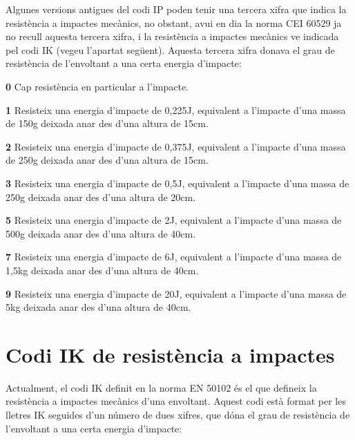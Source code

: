 Algunes versions antigues del codi \textsf{IP} poden tenir una tercera xifra que indica la resist\`{e}ncia a impactes mec\`{a}nics, no obstant, avui en dia la norma \textsf{CEI 60529} ja no recull aquesta tercera xifra, i la resist\`{e}ncia a impactes mec\`{a}nics ve indicada pel codi \textsf{IK} (vegeu l'apartat seg\"{u}ent). Aquesta tercera xifra donava el grau de resist\`{e}ncia de l'envoltant a una certa energia d'impacte:
\begin{list}{}
   {\setlength{\labelwidth}{10mm} \setlength{\leftmargin}{10mm} \setlength{\labelsep}{2mm}}
   \item[\textbf{0}] Cap resist\`{e}ncia en particular a l'impacte.
   \item[\textbf{1}] Resisteix una energia d'impacte de 0{,}225\unit{J}, equivalent a l'impacte d'una massa de 150\unit{g} deixada anar des d'una altura de 15\unit{cm}.
   \item[\textbf{2}] Resisteix una energia d'impacte de 0{,}375\unit{J}, equivalent a l'impacte d'una massa de 250\unit{g} deixada anar des d'una altura de 15\unit{cm}.
   \item[\textbf{3}] Resisteix una energia d'impacte de 0{,}5\unit{J}, equivalent a l'impacte d'una massa de 250\unit{g} deixada anar des d'una altura de 20\unit{cm}.
   \item[\textbf{5}] Resisteix una energia d'impacte de 2\unit{J}, equivalent a l'impacte d'una massa de 500\unit{g} deixada anar des d'una altura de 40\unit{cm}.
   \item[\textbf{7}] Resisteix una energia d'impacte de 6\unit{J}, equivalent a l'impacte d'una massa de 1{,}5\unit{kg} deixada anar des d'una altura de 40\unit{cm}.
   \item[\textbf{9}]Resisteix una energia d'impacte de 20\unit{J}, equivalent a l'impacte d'una massa de 5\unit{kg} deixada anar des d'una altura de 40\unit{cm}.
\end{list}

\section{Codi IK de resist\`{e}ncia a impactes}   

Actualment, el codi \textsf{IK} definit en la norma \textsf{EN 50102} \'{e}s el que defineix la resist\`{e}ncia  a impactes mec\`{a}nics d'una envoltant. Aquest codi est\`{a} format per les lletres \textsf{IK} seguides d'un n\'{u}mero de dues xifres, que d\'{o}na el grau de resist\`{e}ncia de l'envoltant a una certa energia d'impacte:

